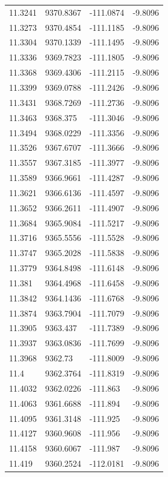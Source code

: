 \begin{table}[H]
\begin{tabular}{llll}
11.3241 & 9370.8367 & -111.0874 & -9.8096 \\
11.3273 & 9370.4854 & -111.1185 & -9.8096 \\
11.3304 & 9370.1339 & -111.1495 & -9.8096 \\
11.3336 & 9369.7823 & -111.1805 & -9.8096 \\
11.3368 & 9369.4306 & -111.2115 & -9.8096 \\
11.3399 & 9369.0788 & -111.2426 & -9.8096 \\
11.3431 & 9368.7269 & -111.2736 & -9.8096 \\
11.3463 & 9368.375 & -111.3046 & -9.8096 \\
11.3494 & 9368.0229 & -111.3356 & -9.8096 \\
11.3526 & 9367.6707 & -111.3666 & -9.8096 \\
11.3557 & 9367.3185 & -111.3977 & -9.8096 \\
11.3589 & 9366.9661 & -111.4287 & -9.8096 \\
11.3621 & 9366.6136 & -111.4597 & -9.8096 \\
11.3652 & 9366.2611 & -111.4907 & -9.8096 \\
11.3684 & 9365.9084 & -111.5217 & -9.8096 \\
11.3716 & 9365.5556 & -111.5528 & -9.8096 \\
11.3747 & 9365.2028 & -111.5838 & -9.8096 \\
11.3779 & 9364.8498 & -111.6148 & -9.8096 \\
11.381 & 9364.4968 & -111.6458 & -9.8096 \\
11.3842 & 9364.1436 & -111.6768 & -9.8096 \\
11.3874 & 9363.7904 & -111.7079 & -9.8096 \\
11.3905 & 9363.437 & -111.7389 & -9.8096 \\
11.3937 & 9363.0836 & -111.7699 & -9.8096 \\
11.3968 & 9362.73 & -111.8009 & -9.8096 \\
11.4 & 9362.3764 & -111.8319 & -9.8096 \\
11.4032 & 9362.0226 & -111.863 & -9.8096 \\
11.4063 & 9361.6688 & -111.894 & -9.8096 \\
11.4095 & 9361.3148 & -111.925 & -9.8096 \\
11.4127 & 9360.9608 & -111.956 & -9.8096 \\
11.4158 & 9360.6067 & -111.987 & -9.8096 \\
11.419 & 9360.2524 & -112.0181 & -9.8096 \\

\end{tabular}
\end{table}

